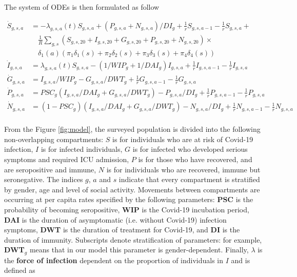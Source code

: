 \documentclass[12pt]{article}
\begin{document}
The system of ODEs is then formulated as follow

\begin{align*}
\dot{S}_{g,s,a} & =  -\lambda_{g,s,a}(t)S_{g,s,a} + (P_{g,s,a} + N_{g,s,a})/DI_g + \frac{1}{r}S_{g,s,a-1} - \frac{1}{r}S_{g,s,a} + \\
& \quad \frac{1}{R}\sum_{g,s}(S_{g,s,20} + I_{g,s,20} + G_{g,s,20} + P_{g,s,20} + N_{g,s,20}) \times \\
& \quad \delta_1(a)(\pi_1\delta_1(s) + \pi_2\delta_2(s) + \pi_3\delta_3(s) + \pi_4\delta_4(s)) \\ 
\dot{I}_{g,s,a}  & =  \lambda_{g,s,a}(t)S_{g,s,a} - (1/WIP_g + 1/DAI_g)I_{g,s,a} + \frac{1}{r}I_{g,s,a-1}-\frac{1}{r}I_{g,s,a} \\
\dot{G}_{g,s,a}  & =  I_{g,s,a}/WIP_g - G_{g,s,a}/DWT_g + \frac{1}{r}G_{g,s,a-1} - \frac{1}{r}G_{g,s,a} \\ 
\dot{P}_{g,s,a}  & =  PSC_g(I_{g,s,a}/DAI_g + G_{g,s,a}/DWT_g) - P_{g,s,a}/DI_g + \frac{1}{r}P_{g,s,a-1} - \frac{1}{r}P_{g,s,a} \\
\dot{N}_{g,s,a}  & =  (1-PSC_g)(I_{g,s,a}/DAI_g + G_{g,s,a}/DWT_g) - N_{g,s,a}/DI_g + \frac{1}{r}N_{g,s,a-1}-\frac{1}{r}N_{g,s,a} \\
\label{eq:ODE}
\end{align*}

From the Figure \ref{fig:model}, the surveyed population is divided into the following non-overlapping compartments: $S$ is for individuals who are at risk of Covid-19 infection, $I$ is for infected individuals, $G$ is for infected who developed serious symptoms and required ICU admission, $P$ is for those who have recovered, and are seropositive and immune, $N$ is for individuals who are recovered, immune but seronegative. The indices $g$, $a$ and $s$ indicate that every compartment is stratified by gender, age and level of social activity. Movements between compartments are occurring at per capita rates specified by the following parameters: \textbf{PSC} is the probability of becoming seropositive, \textbf{WIP} is the Covid-19 incubation period, \textbf{DAI} is the duration of asymptomatic (i.e. without Covid-19) infection symptoms, \textbf{DWT} is the duration of treatment for Covid-19, and \textbf{DI} is the duration of immunity. Subscripts denote stratification of parameters: for example, \textbf{DWT}$_{g}$ means that in our model this parameter is gender-dependent. Finally, $\lambda$ is the \textbf{force of infection} dependent on the proportion of individuals in $I$ and is defined as
\end{document}
